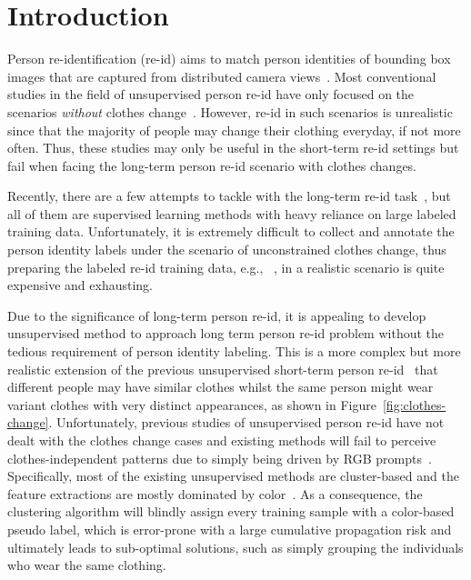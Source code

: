 \documentclass[10pt,twocolumn,letterpaper]{article}
\newcommand{\reid}{re-id}
\newcommand{\name}{\text{Deepchange}}
\def\eg{e.g.}
\begin{document}
\section{Introduction}
\label{sec:intro}
{
Person re-identification (\reid{}) aims to match  person identities of bounding box images that are captured from distributed camera views~\cite{ye:surveyarixv2020}. 
Most conventional studies in the field of unsupervised person re-id have only focused on the scenarios {\em without} clothes change~\cite{zhao:PAMI16,xiao2016learning,ge2018fd}.
However, re-id in such scenarios is unrealistic since that the majority of people may change their clothing everyday, if not more often. 
Thus, these studies may only be useful in the short-term re-id settings but fail when facing  
the long-term person \reid{} scenario with clothes changes. 

Recently, there are a few attempts to tackle with the long-term \reid{} task~\cite{Change:1,Change:2,change:7,change:8}, but all of them are supervised learning methods
with heavy reliance on large labeled training data. 
Unfortunately, it is extremely difficult to collect and annotate the person identity labels under the scenario of unconstrained clothes change, thus preparing the labeled re-id training data, \eg, \name{}~\cite{Deepchange}, in a realistic scenario is quite expensive and exhausting. 
}













{
Due to the significance of long-term person \reid{}, it is appealing to develop unsupervised method to approach long term person re-id problem without the tedious requirement of person identity labeling. 
This is a more complex but more realistic extension of the previous unsupervised short-term person re-id~\cite{li2018unsupervised,Ge:NIPS20, lmkpr} that different people may have similar clothes whilst the same person might wear variant clothes with very distinct appearances, as shown in Figure~\ref{fig:clothes-change}.
Unfortunately, previous studies of unsupervised person re-id have not dealt with the clothes change cases and existing methods will fail to perceive clothes-independent patterns due to simply being driven by RGB prompts~\cite{TIPlmk}. 
Specifically, most of the existing unsupervised methods \cite{dai:ACCV22} are cluster-based and the feature extractions are mostly dominated by color~\cite{TIPlmk}.
As a consequence, the clustering algorithm will blindly assign every training sample with a color-based pseudo label, which is error-prone with a large cumulative propagation risk and ultimately leads to sub-optimal solutions, such as simply grouping the individuals who wear the same clothing.
}
\end{document}
